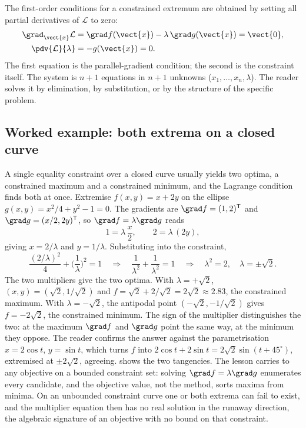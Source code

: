 The first-order conditions for a constrained extremum are obtained
by setting all partial derivatives of $\mathcal{L}$ to zero:
\begin{align*}
\grad_{\vect{x}} \mathcal{L} &= \grad f(\vect{x}) - \lambda\,
\grad g(\vect{x}) = \vect{0}, \\
\pdv{\mathcal{L}}{\lambda} &= -g(\vect{x}) = 0.
\end{align*}
The first equation is the parallel-gradient condition; the second is
the constraint itself. The system is $n + 1$ equations in $n + 1$
unknowns ($x_{1}, \ldots, x_{n}, \lambda$). The reader solves it by
elimination, by substitution, or by the structure of the specific
problem.

\subsection{Worked example: both extrema on a closed curve}

A single equality constraint over a closed curve usually yields two
optima, a constrained maximum and a constrained minimum, and the
Lagrange condition finds both at once. Extremise $f(x, y) = x + 2y$
on the ellipse $g(x, y) = x^{2}/4 + y^{2} - 1 = 0$. The gradients are
$\grad f = (1, 2)^{\mathsf{T}}$ and $\grad g = (x/2, 2y)^{\mathsf{T}}$,
so $\grad f = \lambda\grad g$ reads
\[
1 = \lambda\,\frac{x}{2}, \qquad 2 = \lambda\,(2y),
\]
giving $x = 2/\lambda$ and $y = 1/\lambda$. Substituting into the
constraint,
\[
\frac{(2/\lambda)^{2}}{4} + \Big(\frac{1}{\lambda}\Big)^{2} = 1
\quad\Longrightarrow\quad \frac{1}{\lambda^{2}} + \frac{1}{\lambda^{2}}
= 1 \quad\Longrightarrow\quad \lambda^{2} = 2, \quad \lambda =
\pm\sqrt{2}.
\]
The two multipliers give the two optima. With $\lambda = +\sqrt{2}$,
$(x, y) = (\sqrt{2}, 1/\sqrt{2})$ and $f = \sqrt{2} + 2/\sqrt{2} =
2\sqrt{2} \approx 2.83$, the constrained maximum. With $\lambda =
-\sqrt{2}$, the antipodal point $(-\sqrt{2}, -1/\sqrt{2})$ gives
$f = -2\sqrt{2}$, the constrained minimum. The sign of the multiplier
distinguishes the two: at the maximum $\grad f$ and $\grad g$ point
the same way, at the minimum they oppose. The reader confirms the
answer against the parametrisation $x = 2\cos t$, $y = \sin t$, which
turns $f$ into $2\cos t + 2\sin t = 2\sqrt{2}\sin(t + 45^{\circ})$,
extremised at $\pm 2\sqrt{2}$, agreeing.
 shows the two tangencies. The
lesson carries to any objective on a bounded constraint set: solving
$\grad f = \lambda\grad g$ enumerates every candidate, and the
objective value, not the method, sorts maxima from minima. On an
unbounded constraint curve one or both extrema can fail to exist, and
the multiplier equation then has no real solution in the runaway
direction, the algebraic signature of an objective with no bound on
that constraint.

